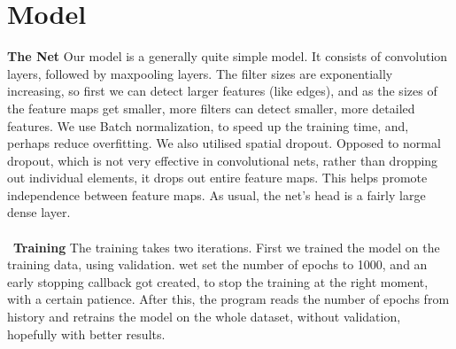 \section{Model}

\textbf{The Net}
\newline
Our model is a generally quite simple model. It consists of convolution layers, followed by maxpooling layers. The filter sizes are exponentially increasing, so first we can detect larger features (like edges), and as the sizes of the feature maps get smaller, more filters can detect smaller, more detailed features. We use Batch normalization, to speed up the training time, and, perhaps reduce overfitting. We also utilised spatial dropout. Opposed to normal dropout, which is not very effective in convolutional nets, rather than dropping out individual elements, it drops out entire feature maps. This helps promote independence between feature maps. As usual, the net’s head is a fairly large dense layer.
\\\
\\\
\textbf{Training}
\newline
The training takes two iterations. First we trained the model on the training data, using validation. wet set the number of epochs to 1000, and an early stopping callback got created, to stop the training at the right moment, with a certain patience. After this, the program reads the number of epochs from history and retrains the model on the whole dataset, without validation, hopefully with better results.